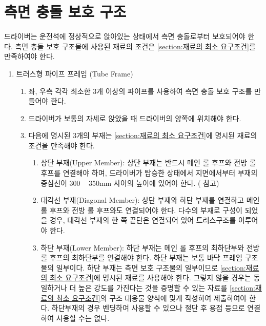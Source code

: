 \documentclass[final,a4paper,10pt]{report}
\begin{document}
\section{측면 충돌 보호 구조}\label{rule:formula-technical.side-impact-structure} \label{section:측면 충돌 보호 구조}
드라이버는 운전석에 정상적으로 앉아있는 상태에서 측면 충돌로부터 보호되어야 한다. 측면 충돌 보호 구조물에 사용된 재료의 조건은 \ref{section:재료의 최소 요구조건}를 만족하여야 한다.
\begin{enumerate}
  \item\label{rule:formula-technical.side-impact-structure.tube-frame} 트러스형 파이프 프레임 (Tube Frame)
    \begin{enumerate}
      \item\label{rule:formula-technical.side-impact-structure.tube-frame.min-3tubes-per-side} 좌, 우측 각각 최소한 3개 이상의 파이프를 사용하여 측면 충돌 보호 구조를 만들어야 한다.
      \item\label{rule:formula-technical.side-impact-structure.tube-frame.either-side-of-driver} 드라이버가 보통의 자세로 앉았을 때 드라이버의 양쪽에 위치해야 한다.

      \item\label{rule:formula-technical.side-impact-structure.tube-frame.three-members} 다음에 명시된 3개의 부재는 \ref{section:재료의 최소 요구조건}에 명시된 재료의 조건을 만족해야 한다.
        \begin{enumerate}
          \item\label{rule:formula-technical.side-impact-structure.tube-frame.three-members.upper-member-height} 상단 부재(Upper Member): 상단 부재는 반드시 메인 롤 후프와 전방 롤 후프를 연결해야 하며, 드라이버가 탑승한 상태에서 지면에서부터 부재의 중심선이 300 \string~ 350mm 사이의 높이에 있어야 한다. ( 참고)
          \item\label{rule:formula-technical.side-impact-structure.tube-frame.three-members.diagonal-member-connectivity} 대각선 부재(Diagonal Member): 상단 부재와 하단 부재를 연결하고 메인 롤 후프와 전방 롤 후프와도 연결되어야 한다. 다수의 부재로 구성이 되었을 경우, 대각선 부재의 한 쪽 끝단은 연결되어 있어 트러스구조를 이루어야 한다.
          \item\label{rule:formula-technical.side-impact-structure.tube-frame.three-members.lower-member-fabrication} 하단 부재(Lower Member): 하단 부재는 메인 롤 후프의 최하단부와 전방 롤 후프의 최하단부를 연결해야 한다. 하단 부재는 보통 바닥 프레임 구조물의 일부이다. 하단 부재는 측면 보호 구조물의 일부이므로 \ref{section:재료의 최소 요구조건}에 명시된 재료를 사용해야 한다. 그렇지 않을 경우는 동일하거나 더 높은 강도를 가진다는 것을 증명할 수 있는 자료를 \ref{section:재료의 최소 요구조건}의 구조 대응물 양식에 맞게 작성하여 제출하여야 한다. 하단부재의 경우 벤딩하여 사용할 수 있으나 절단 후 용접 등으로 연결하여 사용할 수는 없다.

        \end{enumerate}
    \end{enumerate}
\end{enumerate}
\end{document}
